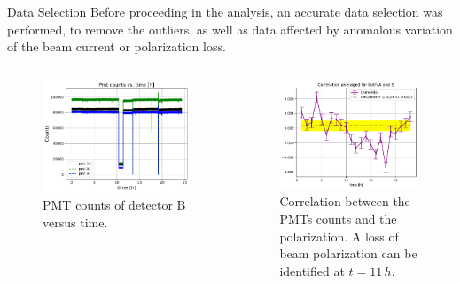 \documentclass[9pt,a4paper]{beamer}
\begin{document}
\begin{frame}{Data Selection}
Before proceeding in the analysis, an accurate data selection was performed, to remove the outliers, as well as data affected by anomalous variation of the beam current or polarization loss.

\begin{columns}
\begin{column}{0.5\textwidth}
\begin{figure}
\includegraphics[width = 1\textwidth]{figures/BeamExample.pdf}
\caption{PMT counts of detector B versus time.}
\end{figure}
\end{column}
\begin{column}{0.5\textwidth}
\begin{figure}
\includegraphics[width = 1\textwidth]{figures/OverallCorr.pdf}
\caption{Correlation between the PMTs counts and the polarization. A loss of beam polarization can be identified at $t = 11 \, h$.}
\end{figure}
\end{column}
\end{columns}
\end{frame}
\end{document}
